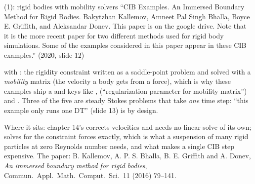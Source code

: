 \documentclass[aspectratio=169,11pt]{beamer}
\begin{document}
\begin{frame}{ (1): rigid bodies with mobility solvers}
\label{fr:cib}
\footnotesize ``CIB Examples. An Immersed Boundary Method for Rigid Bodies. Bakytzhan Kallemov, Amneet Pal Singh Bhalla, Boyce E. Griffith, and Aleksandar Donev. This paper is on the google drive. Note that it is the more recent paper for two different methods used for rigid body simulations. Some of the examples considered in this paper appear in these CIB examples.'' (2020, slide 12)
\vspace{1mm}

\footnotesize {} with : the rigidity constraint written as a saddle-point problem and solved with a \emph{mobility} matrix (the velocity a body gets from a force), which is why these examples ship a  and keys like ,  (``regularization parameter for mobility matrix'') and . Three of the five are steady Stokes problems that take \emph{one} time step: ``this example only runs one DT'' (slide 13) is by design.
\vspace{1mm}

\footnotesize Where it sits: chapter 14's  corrects velocities and needs no linear solve of its own;  solves for the constraint forces exactly, which is what a suspension of many rigid particles at zero Reynolds number needs, and what makes a single CIB step expensive. The paper: B. Kallemov, A. P. S. Bhalla, B. E. Griffith and A. Donev, \emph{An immersed boundary method for rigid bodies}, Commun.\ Appl.\ Math.\ Comput.\ Sci.\ 11 (2016) 79--141.
\end{frame}
\end{document}
